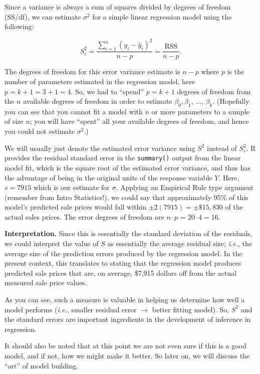 \documentclass[
]{book}
\begin{document}
Since a variance is always a sum of squares divided by degrees of freedom (SS/df), we can estimate \(\sigma^2\) for a simple linear regression model using the following:

\[S^2_{\varepsilon} = \frac{\sum_{i=1}^n(y_i - \hat{y}_i)^2}{n-p} = \frac{\textrm{RSS}}{n-p}.\]

The degrees of freedom for this error variance estimate is \(n -p\) where \(p\) is the number of parameters estimated in the regression model, here \(p = k+1 = 3+1=4\).
So, we had to ``spend'' \(p=k+1\) degrees of freedom from the \(n\) available degrees of freedom in order to estimate \(\beta_0, \beta_1\), \(\ldots\), \(\beta_k\).
(Hopefully you can see that you cannot fit a model with \(n\) or more parameters to a sample of size \(n\); you will have ``spent'' all your available degrees of freedom, and hence you could not estimate \(\sigma^2\).)

We will usually just denote the estimated error variance using \(S^2\) instead of \(S^2_{\varepsilon}\).
R provides the residual standard error in the \texttt{summary()} output from the linear model fit, which is the square root of the estimated error variance, and thus has the advantage of being in the original units of the response variable \(Y\).
Here, \(s = 7915\) which is our estimate for \(\sigma\).
Applying an Empirical Rule type argument (remember from Intro Statistics!), we could say that approximately 95\% of this model's predicted sale prices would fall within \(\pm 2(7915) = \pm \$15,830\) of the actual sales prices.
The error degrees of freedom are \(n – p\) = \(20 – 4 = 16\).

\textbf{Interpretation.} Since this is essentially the standard deviation of the residuals, we could interpret the value of \(S\) as essentially the average residual size; \emph{i.e.}, the average size of the prediction errors produced by the regression model.
In the present context, this translates to stating that the regression model produces predicted sale prices that are, on average, \$7,915 dollars off from the actual measured sale price values.

As you can see, such a measure is valuable in helping us determine how well a model performs (\emph{i.e.}, smaller residual error \(\rightarrow\) better fitting model).
So, \(S^2\) and the standard errors are important ingredients in the development of inference in regression.

It should also be noted that at this point we are not even sure if this is a good model, and if not, how we might make it better.
So later on, we will discuss the ``art'' of model building.
\end{document}
